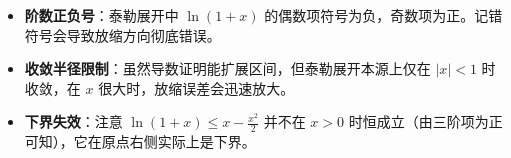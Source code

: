 \begin{trapbox}
\begin{itemize}
    \item \textbf{阶数正负号}：泰勒展开中 $\ln(1+x)$ 的偶数项符号为负，奇数项为正。记错符号会导致放缩方向彻底错误。
    \item \textbf{收敛半径限制}：虽然导数证明能扩展区间，但泰勒展开本源上仅在 $|x|<1$ 时收敛，在 $x$ 很大时，放缩误差会迅速放大。
    \item \textbf{下界失效}：注意 $\ln(1+x) \leqslant x - \frac{x^2}{2}$ 并不在 $x>0$ 时恒成立（由三阶项为正可知），它在原点右侧实际上是下界。
\end{itemize}
\end{trapbox}